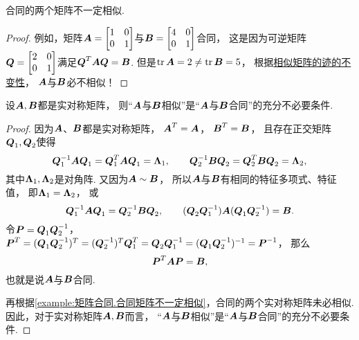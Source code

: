 \begin{proposition}\label{example:矩阵合同.合同矩阵不一定相似}
合同的两个矩阵不一定相似.
\begin{proof}
例如，矩阵\(\boldsymbol{A}=\begin{bmatrix}
	1 & 0 \\
	0 & 1
\end{bmatrix}\)与\(\boldsymbol{B}=\begin{bmatrix}
	4 & 0 \\
	0 & 1
\end{bmatrix}\)合同，
这是因为可逆矩阵\(\boldsymbol{Q}=\begin{bmatrix}
	2 & 0 \\
	0 & 1
\end{bmatrix}\)满足\(\boldsymbol{Q}^T\boldsymbol{A}\boldsymbol{Q}=\boldsymbol{B}\).
但是\(\tr\boldsymbol{A}=2 \neq \tr\boldsymbol{B} = 5\)，
根据\hyperref[theorem:特征值与特征向量.相似矩阵的迹的不变性]{相似矩阵的迹的不变性}，
\(\boldsymbol{A}\)与\(\boldsymbol{B}\)必不相似！
\end{proof}
\end{proposition}

\begin{proposition}\label{theorem:二次型.实对称矩阵相似必合同}
设\(\boldsymbol{A},\boldsymbol{B}\)都是实对称矩阵，
则“\(\boldsymbol{A}\)与\(\boldsymbol{B}\)相似”是“\(\boldsymbol{A}\)与\(\boldsymbol{B}\)合同”的充分不必要条件.
\begin{proof}
因为\(\boldsymbol{A}\)、\(\boldsymbol{B}\)都是实对称矩阵，
\(\boldsymbol{A}^T=\boldsymbol{A}\)，
\(\boldsymbol{B}^T=\boldsymbol{B}\)，
且存在正交矩阵\(\boldsymbol{Q}_1,\boldsymbol{Q}_2\)使得\[
	\boldsymbol{Q}_1^{-1} \boldsymbol{A} \boldsymbol{Q}_1 = \boldsymbol{Q}_1^T \boldsymbol{A} \boldsymbol{Q}_1 = \boldsymbol{\Lambda}_1,
	\qquad
	\boldsymbol{Q}_2^{-1} \boldsymbol{B} \boldsymbol{Q}_2 = \boldsymbol{Q}_2^T \boldsymbol{B} \boldsymbol{Q}_2 = \boldsymbol{\Lambda}_2,
\]
其中\(\boldsymbol{\Lambda}_1,\boldsymbol{\Lambda}_2\)是对角阵.
又因为\(\boldsymbol{A}\sim\boldsymbol{B}\)，
所以\(\boldsymbol{A}\)与\(\boldsymbol{B}\)有相同的特征多项式、特征值，
即\(\boldsymbol{\Lambda}_1=\boldsymbol{\Lambda}_2\)，
或\[
	\boldsymbol{Q}_1^{-1} \boldsymbol{A} \boldsymbol{Q}_1 = \boldsymbol{Q}_2^{-1} \boldsymbol{B} \boldsymbol{Q}_2,
	\qquad
	(\boldsymbol{Q}_2 \boldsymbol{Q}_1^{-1}) \boldsymbol{A} (\boldsymbol{Q}_1 \boldsymbol{Q}_2^{-1}) = \boldsymbol{B}.
\]
令\(\boldsymbol{P} = \boldsymbol{Q}_1 \boldsymbol{Q}_2^{-1}\)，
\(\boldsymbol{P}^T = (\boldsymbol{Q}_1 \boldsymbol{Q}_2^{-1})^T
= (\boldsymbol{Q}_2^{-1})^T \boldsymbol{Q}_1^T
= \boldsymbol{Q}_2 \boldsymbol{Q}_1^{-1}
= (\boldsymbol{Q}_1 \boldsymbol{Q}_2^{-1})^{-1}
= \boldsymbol{P}^{-1}\)，
那么\[
	\boldsymbol{P}^T \boldsymbol{A} \boldsymbol{P} = \boldsymbol{B},
\]
也就是说\(\boldsymbol{A}\)与\(\boldsymbol{B}\)合同.

再根据\cref{example:矩阵合同.合同矩阵不一定相似}，合同的两个实对称矩阵未必相似.
因此，对于实对称矩阵\(\boldsymbol{A},\boldsymbol{B}\)而言，
“\(\boldsymbol{A}\)与\(\boldsymbol{B}\)相似”是“\(\boldsymbol{A}\)与\(\boldsymbol{B}\)合同”的充分不必要条件.
\end{proof}
\end{proposition}

